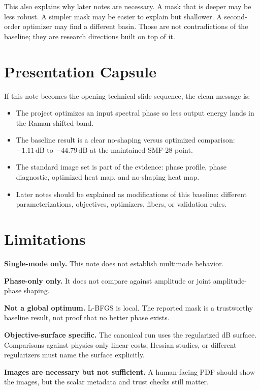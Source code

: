 \documentclass[11pt]{article}
\begin{document}
This also explains why later notes are necessary. A mask that is deeper may be
less robust. A simpler mask may be easier to explain but shallower. A
second-order optimizer may find a different basin. Those are not contradictions
of the baseline; they are research directions built on top of it.

\section{Presentation Capsule}

If this note becomes the opening technical slide sequence, the clean message is:
\begin{itemize}
    \item The project optimizes an input spectral phase so less output energy lands in the Raman-shifted band.
    \item The baseline result is a clear no-shaping versus optimized comparison: \(-1.11\,\mathrm{dB}\) to \(-44.79\,\mathrm{dB}\) at the maintained SMF-28 point.
    \item The standard image set is part of the evidence: phase profile, phase diagnostic, optimized heat map, and no-shaping heat map.
    \item Later notes should be explained as modifications of this baseline: different parameterizations, objectives, optimizers, fibers, or validation rules.
\end{itemize}

\section{Limitations}

\textbf{Single-mode only.} This note does not establish multimode behavior.

\textbf{Phase-only only.} It does not compare against amplitude or joint
amplitude-phase shaping.

\textbf{Not a global optimum.} L-BFGS is local. The reported mask is a
trustworthy baseline result, not proof that no better phase exists.

\textbf{Objective-surface specific.} The canonical run uses the regularized dB
surface. Comparisons against physics-only linear costs, Hessian studies, or
different regularizers must name the surface explicitly.

\textbf{Images are necessary but not sufficient.} A human-facing PDF should
show the images, but the scalar metadata and trust checks still matter.
\end{document}
